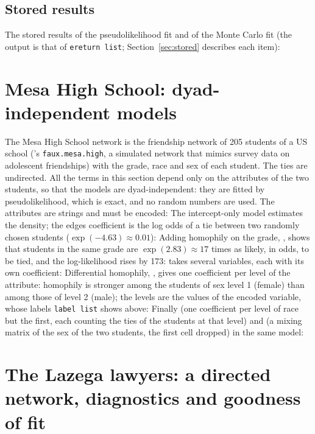 \subsection{Stored results}\label{sec:flo_ereturn}

The stored results of the pseudolikelihood fit and of the Monte Carlo fit (the output is that of \texttt{ereturn list}; Section~\ref{sec:stored} describes each item):

\section{Mesa High School: dyad-independent models}\label{sec:mesa}

The Mesa High School network is the friendship network of 205 students of a US school (\ergm{}'s \texttt{faux.mesa.high}, a simulated network that mimics survey data on adolescent friendships) with the grade, race and sex of each student. The ties are undirected. All the terms in this section depend only on the attributes of the two students, so that the models are dyad-independent: they are fitted by pseudolikelihood, which is exact, and no random numbers are used. The attributes are strings and must be encoded:
The intercept-only model estimates the density; the edges coefficient is the log odds of a tie between two randomly chosen students ($\exp(-4.63)\approx0.01$):
Adding homophily on the grade, , shows that students in the same grade are $\exp(2.83)\approx17$ times as likely, in odds, to be tied, and the log-likelihood rises by 173:
 takes several variables, each with its own coefficient:
Differential homophily, , gives one coefficient per level of the attribute: homophily is stronger among the students of sex level 1 (female) than among those of level 2 (male); the levels are the values of the encoded variable, whose labels \texttt{label list} shows above:
Finally  (one coefficient per level of race but the first, each counting the ties of the students at that level) and  (a mixing matrix of the sex of the two students, the first cell dropped) in the same model:

\section{The Lazega lawyers: a directed network, diagnostics and goodness of fit}\label{sec:lazega}

